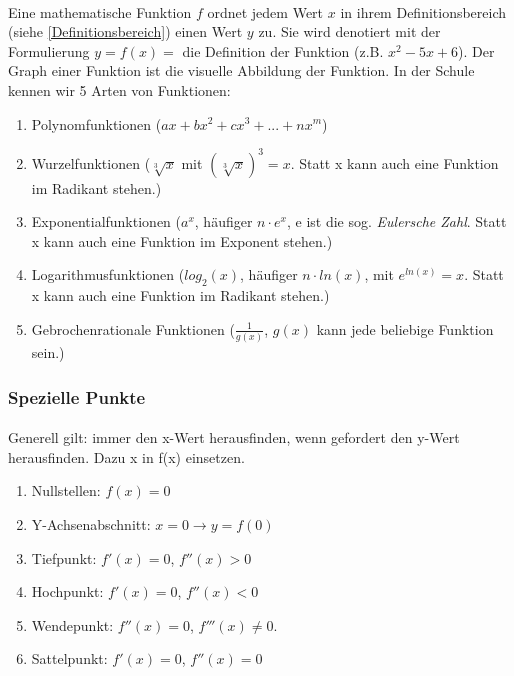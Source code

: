 \documentclass{article}
\begin{document}
		\paragraph{}
			Eine mathematische Funktion $f$ ordnet jedem Wert $x$ in ihrem Definitionsbereich (siehe \ref{Definitionsbereich})
			einen Wert $y$ zu. Sie wird denotiert mit der Formulierung $y=f(x)= $ die Definition der Funktion (z.B. $x^2-5x+6$).
			Der Graph einer Funktion ist die visuelle Abbildung der Funktion. In der Schule kennen wir 5 Arten von Funktionen:
			\begin{enumerate}
			    \item Polynomfunktionen ($ax+bx^2+cx^3+...+nx^m$)
			    \item Wurzelfunktionen ($ \sqrt[3]{x} $ mit $ (\sqrt[3]{x})^3=x $. Statt x kann auch eine Funktion im Radikant stehen.)
			    \item Exponentialfunktionen ($a^{x}$, häufiger $n \cdot e^x$, e ist die sog. \emph{Eulersche Zahl}. Statt x kann auch eine Funktion im Exponent stehen.)
			    \item Logarithmusfunktionen ($log_2(x)$, häufiger $n \cdot ln(x)$, mit $e^{ln(x)}=x$. Statt x kann auch eine Funktion im Radikant stehen.)
			    \item Gebrochenrationale Funktionen ($\frac{1}{g(x)}$, $g(x)$ kann jede beliebige Funktion sein.)
			
			\end{enumerate}

	\subsubsection{Spezielle Punkte}\label{Spezielle Punkte}
		\paragraph{}
			Generell gilt: immer den x-Wert herausfinden, wenn gefordert den y-Wert herausfinden. Dazu x in f(x) einsetzen.

			\begin{enumerate}
			    \item Nullstellen: $f(x)=0$
			    \item Y-Achsenabschnitt: $x=0 \rightarrow y=f(0)$
			    \item Tiefpunkt: $f'(x)=0$, $f''(x)>0$
			    \item Hochpunkt: $f'(x)=0$, $f''(x)<0$
			    \item Wendepunkt: $f''(x)=0$, $f'''(x)\neq 0$.
			    \item Sattelpunkt: $f'(x)=0$, $f''(x)=0$
			\end{enumerate}
\end{document}
